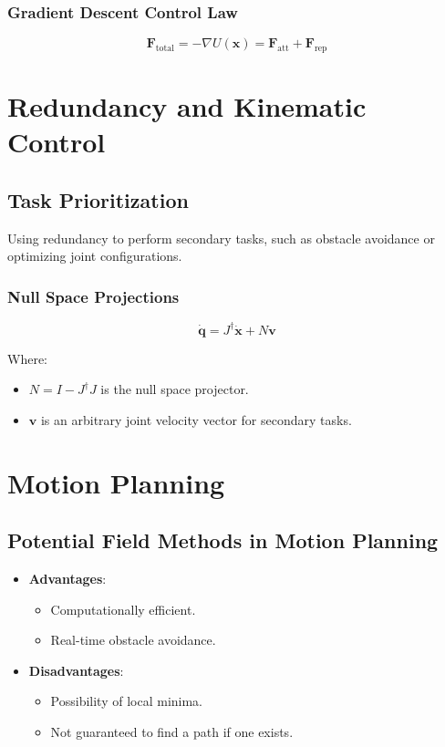 \documentclass{article}
\begin{document}
\subsubsection{Gradient Descent Control Law}

$$
\mathbf{F}_{\text{total}} = -\nabla U(\mathbf{x}) = \mathbf{F}_{\text{att}} + \mathbf{F}_{\text{rep}}
$$

\section{Redundancy and Kinematic Control}

\subsection{Task Prioritization}

Using redundancy to perform secondary tasks, such as obstacle avoidance or optimizing joint configurations.

\subsubsection{Null Space Projections}

$$
\dot{\mathbf{q}} = J^\dagger \dot{\mathbf{x}} + N \mathbf{v}
$$

Where:
\begin{itemize}
    \item $N = I - J^\dagger J$ is the null space projector.
    \item $\mathbf{v}$ is an arbitrary joint velocity vector for secondary tasks.
\end{itemize}

\section{Motion Planning}

\subsection{Potential Field Methods in Motion Planning}

\begin{itemize}
    \item \textbf{Advantages}:
    \begin{itemize}
        \item Computationally efficient.
        \item Real-time obstacle avoidance.
    \end{itemize}
    \item \textbf{Disadvantages}:
    \begin{itemize}
        \item Possibility of local minima.
        \item Not guaranteed to find a path if one exists.
    \end{itemize}
\end{itemize}
\end{document}
